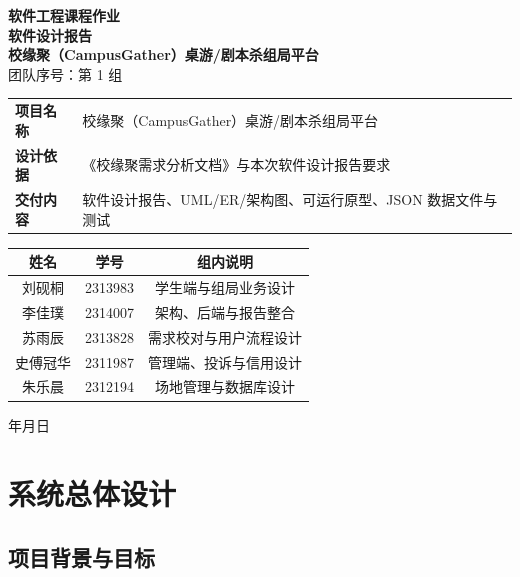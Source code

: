 \documentclass[a4paper]{article}
\renewcommand{\today}{\number\year 年\number\month 月\number\day 日}
\begin{document}
\begin{titlepage}
  \begin{center}
    \vspace*{1.5cm}
    {\Huge\bfseries\kaishu 软件工程课程作业}\\[0.9cm]
    {\Huge\bfseries\kaishu 软件设计报告}\\[2.2cm]
    {\LARGE\bfseries 校缘聚（CampusGather）桌游/剧本杀组局平台}\\[1.2cm]
    {\Large 团队序号：第 1 组}\\[1.6cm]

    \begin{tabular}{>{\bfseries}p{3.0cm}p{8.0cm}}
      项目名称 & 校缘聚（CampusGather）桌游/剧本杀组局平台 \\
      设计依据 & 《校缘聚需求分析文档》与本次软件设计报告要求 \\
      交付内容 & 软件设计报告、UML/ER/架构图、可运行原型、JSON 数据文件与测试 \\
    \end{tabular}

    \vspace{1.8cm}
    \begin{tabular}{ccc}
      \toprule
      姓名 & 学号 & 组内说明 \\
      \midrule
      刘砚桐 & 2313983 & 学生端与组局业务设计 \\
      李佳璞 & 2314007 & 架构、后端与报告整合 \\
      苏雨辰 & 2313828 & 需求校对与用户流程设计 \\
      史傅冠华 & 2311987 & 管理端、投诉与信用设计 \\
      朱乐晨 & 2312194 & 场地管理与数据库设计 \\
      \bottomrule
    \end{tabular}

    \vfill
    {\Large \today}
  \end{center}
\end{titlepage}

\clearpage
\tableofcontents
\newpage

\section{系统总体设计}

\subsection{项目背景与目标}
\end{document}
